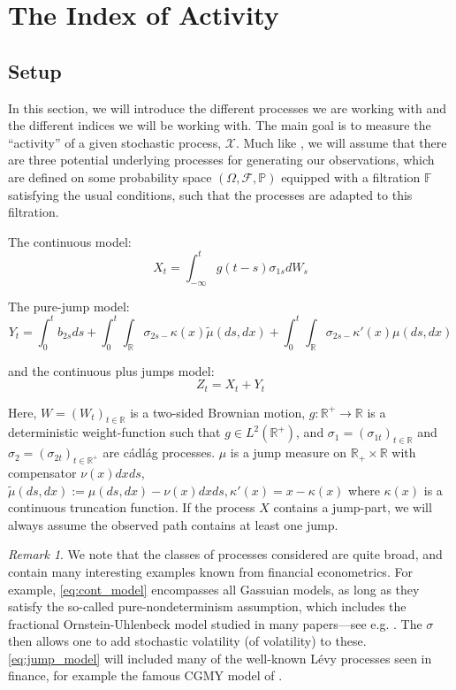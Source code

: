 \documentclass[fleqn,11pt,letterpaper]{article}
\theoremstyle{plain}
\theoremstyle{definition}
\theoremstyle{remark}
\newtheorem{remark}{Remark}[section]
\numberwithin{equation}{section}
\begin{document}
\section{The Index of Activity}\label{sec:activity}

\subsection{Setup}\label{subsec:setup}
In this section, we will introduce the different processes we are working with and the different indices we will be working with. The main goal is to measure the ``activity'' of a given stochastic process, $\mathcal{X}$. Much like \cite{Todorov2010}, we will assume that there are three potential underlying processes for generating our observations, which are defined on some probability space $(\Omega,\mathcal{F},\mathbb{P})$ equipped with a filtration $\mathbb{F}$ satisfying the usual conditions, such that the processes are adapted to this filtration. 

The continuous model: 
\begin{equation} \label{eq:cont_model}
    X_{t}=\int_{-\infty}^{t}g(t-s)\sigma_{1s}dW_s
\end{equation}

The pure-jump model: 
\begin{equation} \label{eq:jump_model}
    Y_{t}=\int_{0}^{t}b_{2s}ds+\int_{0}^{t}\int_{\mathbb{R}}\sigma_{2s-}\kappa(x)\tilde{\mu}(ds,dx)+\int_{0}^{t}\int_{\mathbb{R}}\sigma_{2s-}\kappa'(x)\mu(ds,dx)
\end{equation}

and the continuous plus jumps model: 
\begin{equation} \label{eq:cont_jump_model}
    Z_{t}=X_{t}+Y_{t}
\end{equation}

Here, $W=(W_t)_{t\in\mathbb{R}}$ is a two-sided Brownian motion, $g:\mathbb{R}^+\to\mathbb{R}$ is a deterministic weight-function such that $g\in L^2(\mathbb{R}^+)$, and $\sigma_1=(\sigma_{1t})_{t\in\mathbb{R}}$ and $\sigma_2=(\sigma_{2t})_{t\in\mathbb{R}^+}$ are cádlág processes. $\mu$ is a jump measure on $\mathbb{R}_{+}\times\mathbb{R}$ with compensator $\nu(x)dxds$, $\tilde{\mu}(ds,dx):=\mu(ds,dx)-\nu(x)dxds, \kappa'(x)=x-\kappa(x)$ where $\kappa(x)$ is a continuous truncation function. If the process $X$ contains a jump-part, we will always assume the observed path contains at least one jump. 

\begin{remark}
    We note that the classes of processes considered are quite broad, and contain many interesting examples known from financial econometrics. For example, \eqref{eq:cont_model} encompasses all Gassuian models, as long as they satisfy the so-called pure-nondeterminism assumption, which includes the fractional Ornstein-Uhlenbeck model studied in many papers---see e.g. \cite{BennedsenEtAl2023}. The $\sigma$ then allows one to add stochastic volatility (of volatility) to these. \eqref{eq:jump_model} will included many of the well-known Lévy processes seen in finance, for example the famous CGMY model of \cite{CarrEtAl2002}.
\end{remark}
\end{document}
